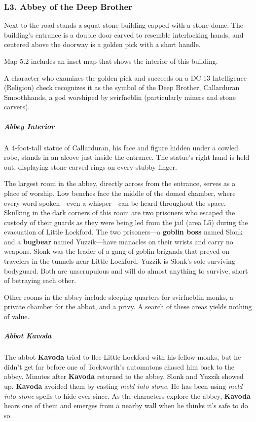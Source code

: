 \documentclass[10pt,a4paper,twoside,bg=print,twocolumn,openany,nodeprecatedcode]{dndbook}
\begin{document}
\subsubsection{L3. Abbey of the Deep Brother}
\begin{DndReadAloud}{}
Next to the road stands a squat stone building capped with a stone dome. The building's entrance is a double door carved to resemble interlocking hands, and centered above the doorway is a golden pick with a short handle.

\end{DndReadAloud}

Map 5.2 includes an inset map that shows the interior of this building.

A character who examines the golden pick and succeeds on a DC 13 Intelligence (Religion) check recognizes it as the symbol of the Deep Brother, Callarduran Smoothhands, a god worshiped by svirfneblin (particularly miners and stone carvers).

\subparagraph{Abbey Interior}
A 4-foot-tall statue of Callarduran, his face and figure hidden under a cowled robe, stands in an alcove just inside the entrance. The statue's right hand is held out, displaying stone-carved rings on every stubby finger.

The largest room in the abbey, directly across from the entrance, serves as a place of worship. Low benches face the middle of the domed chamber, where every word spoken—even a whisper—can be heard throughout the space. Skulking in the dark corners of this room are two prisoners who escaped the custody of their guards as they were being led from the jail (area L5) during the evacuation of Little Lockford. The two prisoners—a \textbf{goblin boss} named Slonk and a \textbf{bugbear} named Yuzzik—have manacles on their wrists and carry no weapons. Slonk was the leader of a gang of goblin brigands that preyed on travelers in the tunnels near Little Lockford. Yuzzik is Slonk's sole surviving bodyguard. Both are unscrupulous and will do almost anything to survive, short of betraying each other.

Other rooms in the abbey include sleeping quarters for svirfneblin monks, a private chamber for the abbot, and a privy. A search of these areas yields nothing of value.

\subparagraph{Abbot Kavoda}
The abbot \textbf{Kavoda} tried to flee Little Lockford with his fellow monks, but he didn't get far before one of Tockworth's automatons chased him back to the abbey. Minutes after \textbf{Kavoda} returned to the abbey, Slonk and Yuzzik showed up. \textbf{Kavoda} avoided them by casting \textit{meld into stone}. He has been using \textit{meld into stone} spells to hide ever since. As the characters explore the abbey, \textbf{Kavoda} hears one of them and emerges from a nearby wall when he thinks it's safe to do so.
\end{document}
